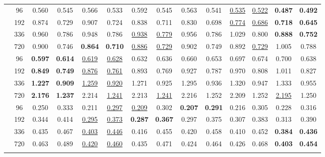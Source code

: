 \begin{table*}[!ht]
{\begin{tabular}{c|c|cc|cc|cc|cc|cc|cc}
	\midrule
	\multirow{4}{*}{\rotatebox[origin=c]{90}{\text{ETTm1}}}
		& 96 &  0.560 & 0.545 &  0.566 & 0.533 &  0.592 & 0.545 &  0.563 & 0.541 &  \underline{0.535} & \underline{0.522} &  \textbf{0.487} & \textbf{0.492}  \\
		& 192 &  0.874 & 0.729 &  0.907 & 0.724 &  0.838 & 0.711 &  0.830 & 0.698 &  \underline{0.774} & \underline{0.686} &  \textbf{0.718} & \textbf{0.645}  \\
		& 336 &  0.960 & 0.786 &  0.948 & 0.786 &  \underline{0.938} & \underline{0.779} &  0.956 & 0.786 &  1.029 & 0.800 &  \textbf{0.888} & \textbf{0.752}  \\
		& 720 &  0.900 & 0.746 &  \textbf{0.864} & \textbf{0.710} &  \underline{0.886} & \underline{0.729} &  0.902 & 0.749 &  0.892 & \underline{0.729} &  1.005 & 0.788  \\
	\midrule
	\multirow{4}{*}{\rotatebox[origin=c]{90}{\text{ETTm2}}}
		& 96 &  \textbf{0.597} & \textbf{0.614} &  \underline{0.619} & \underline{0.628} &  0.632 & 0.636 &  0.660 & 0.653 &  0.697 & 0.674 &  0.700 & 0.638  \\
		& 192 &  \textbf{0.849} & \textbf{0.749} &  \underline{0.876} & \underline{0.761} &  0.893 & 0.769 &  0.927 & 0.787 &  0.970 & 0.808 &  1.011 & 0.827  \\
		& 336 &  \textbf{1.227} & \textbf{0.909} &  \underline{1.259} & \underline{0.920} &  1.271 & 0.925 &  1.295 & 0.936 &  1.320 & 0.947 &  1.333 & 0.955  \\
		& 720 &  \textbf{2.176} & \textbf{1.237} &  2.214 & \underline{1.241} &  2.213 & \underline{1.241} &  2.216 & 1.252 &  2.209 & 1.252 &  \underline{2.195} & 1.250  \\
	\midrule
	\multirow{4}{*}{\rotatebox[origin=c]{90}{\text{Weather}}}
		& 96 &  0.250 & 0.333 &  0.211 & \underline{0.297} &  \underline{0.209} & 0.302 &  \textbf{0.207} & \textbf{0.291} &  0.216 & 0.305 &  0.228 & 0.316  \\
		& 192 &  0.344 & 0.414 &  \underline{0.295} & \underline{0.373} &  \textbf{0.287} & \textbf{0.367} &  0.297 & 0.375 &  0.307 & 0.383 &  0.313 & 0.390  \\
		& 336 &  0.435 & 0.467 &  \underline{0.403} & \underline{0.446} &  0.416 & 0.455 &  0.420 & 0.458 &  0.410 & 0.452 &  \textbf{0.384} & \textbf{0.436}  \\
		& 720 &  0.463 & 0.489 &  \underline{0.420} & \underline{0.460} &  0.435 & 0.471 &  0.424 & 0.464 &  0.426 & 0.468 &  \textbf{0.403} & \textbf{0.454}  \\
	\midrule
	\multirow{4}{*}{\rotatebox[origin=c]{90}{\text{Electricity}}}

\end{tabular}}
\end{table*}
